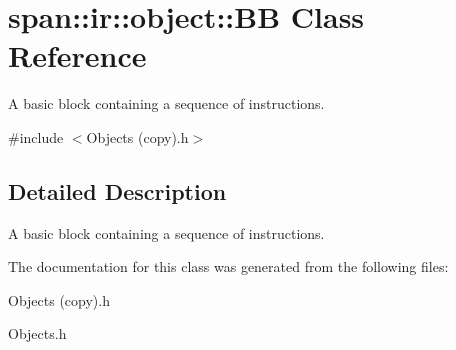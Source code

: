 \hypertarget{classspan_1_1ir_1_1object_1_1BB}{}\section{span\+:\+:ir\+:\+:object\+:\+:BB Class Reference}
\label{classspan_1_1ir_1_1object_1_1BB}


A basic block containing a sequence of instructions.  




{\ttfamily \#include $<$Objects (copy).\+h$>$}



\subsection{Detailed Description}
A basic block containing a sequence of instructions. 

The documentation for this class was generated from the following files\+:\begin{DoxyCompactItemize}
\item 
Objects (copy).\+h\item 
Objects.\+h\end{DoxyCompactItemize}
